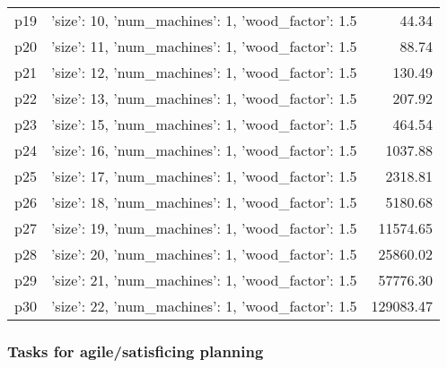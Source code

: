 \documentclass{article}
\begin{document}
\begin{center}
\begin{tabular}{@{}l|r|r@{}}
  p19&{'size': 10, 'num\_machines': 1, 'wood\_factor': 1.5}&44.34\\
  p20&{'size': 11, 'num\_machines': 1, 'wood\_factor': 1.5}&88.74\\
  p21&{'size': 12, 'num\_machines': 1, 'wood\_factor': 1.5}&130.49\\
  p22&{'size': 13, 'num\_machines': 1, 'wood\_factor': 1.5}&207.92\\
  p23&{'size': 15, 'num\_machines': 1, 'wood\_factor': 1.5}&464.54\\
  p24&{'size': 16, 'num\_machines': 1, 'wood\_factor': 1.5}&1037.88\\
  p25&{'size': 17, 'num\_machines': 1, 'wood\_factor': 1.5}&2318.81\\
  p26&{'size': 18, 'num\_machines': 1, 'wood\_factor': 1.5}&5180.68\\
  p27&{'size': 19, 'num\_machines': 1, 'wood\_factor': 1.5}&11574.65\\
  p28&{'size': 20, 'num\_machines': 1, 'wood\_factor': 1.5}&25860.02\\
  p29&{'size': 21, 'num\_machines': 1, 'wood\_factor': 1.5}&57776.30\\
  p30&{'size': 22, 'num\_machines': 1, 'wood\_factor': 1.5}&129083.47
                            \end{tabular}
                            \end{center}
                    

                                \subsubsection*{Tasks for agile/satisficing planning}
                                
\end{document}
